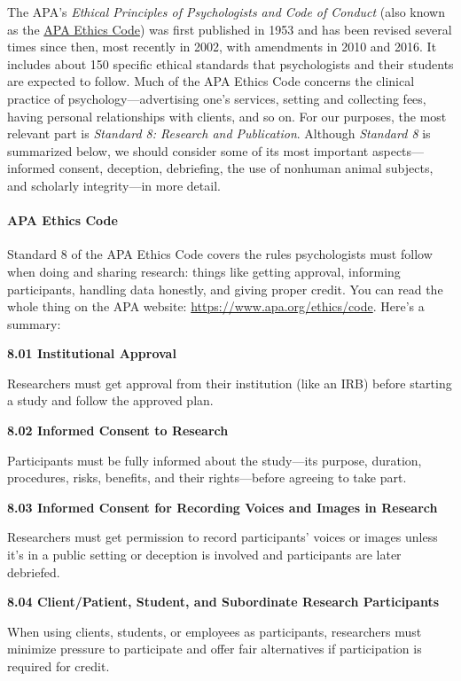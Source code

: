 \documentclass[
]{krantz}
\begin{document}
The APA's \emph{Ethical Principles of Psychologists and Code of Conduct} (also known as the \hyperref[apa-ethics-code]{APA Ethics Code}) was first published in 1953 and has been revised several times since then, most recently in 2002, with amendments in 2010 and 2016. It includes about 150 specific ethical standards that psychologists and their students are expected to follow. Much of the APA Ethics Code concerns the clinical practice of psychology---advertising one's services, setting and collecting fees, having personal relationships with clients, and so on. For our purposes, the most relevant part is \emph{Standard 8: Research and Publication}. Although \emph{Standard 8} is summarized below, we should consider some of its most important aspects---informed consent, deception, debriefing, the use of nonhuman animal subjects, and scholarly integrity---in more detail.

\paragraph*{APA Ethics Code}\label{apa-ethics-code-1}

Standard 8 of the APA Ethics Code covers the rules psychologists must follow when doing and sharing research: things like getting approval, informing participants, handling data honestly, and giving proper credit. You can read the whole thing on the APA website: \url{https://www.apa.org/ethics/code}. Here's a summary:

\textbf{8.01 Institutional Approval}

Researchers must get approval from their institution (like an IRB) before starting a study and follow the approved plan.

\textbf{8.02 Informed Consent to Research}

Participants must be fully informed about the study---its purpose, duration, procedures, risks, benefits, and their rights---before agreeing to take part.

\textbf{8.03 Informed Consent for Recording Voices and Images in Research}

Researchers must get permission to record participants' voices or images unless it's in a public setting or deception is involved and participants are later debriefed.

\textbf{8.04 Client/Patient, Student, and Subordinate Research Participants}

When using clients, students, or employees as participants, researchers must minimize pressure to participate and offer fair alternatives if participation is required for credit.
\end{document}

